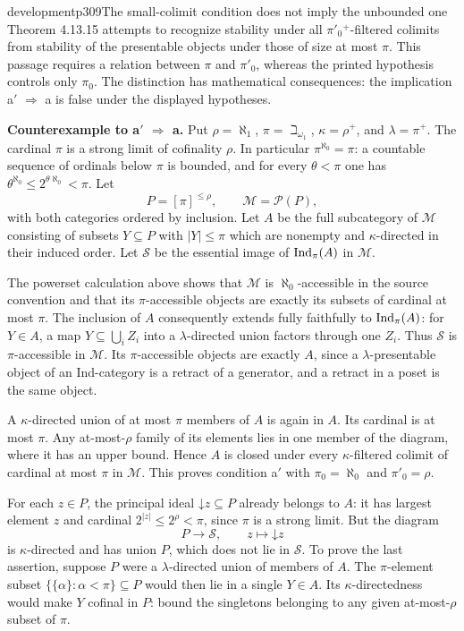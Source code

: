 \begin{dcomment}{development}{p309}{The small-colimit condition does not imply the unbounded one}
Theorem 4.13.15 attempts to recognize stability under all $\pi'_0{}^+$-filtered colimits from stability of the presentable objects under those of size at most $\pi$. This passage requires a relation between $\pi$ and $\pi'_0$, whereas the printed hypothesis controls only $\pi_0$. The distinction has mathematical consequences: the implication a$'$ $\Rightarrow$ a is false under the displayed hypotheses.

\textbf{Counterexample to a$'$ $\Rightarrow$ a.}\ours
Put $\rho=\aleph_1$, $\pi=\beth_{\omega_1}$, $\kappa=\rho^+$, and $\lambda=\pi^+$. The cardinal $\pi$ is a strong limit of cofinality $\rho$. In particular $\pi^{\aleph_0}=\pi$: a countable sequence of ordinals below $\pi$ is bounded, and for every $\theta<\pi$ one has $\theta^{\aleph_0}\leq 2^{\theta\aleph_0}<\pi$. Let
\[
 P=[\pi]^{\leq\rho},\qquad \mathcal M=\mathcal P(P),
\]
with both categories ordered by inclusion. Let $A$ be the full subcategory of $\mathcal M$ consisting of subsets $Y\subseteq P$ with $|Y|\leq\pi$ which are nonempty and $\kappa$-directed in their induced order. Let $\mathcal S$ be the essential image of $\mathrm{Ind}_\pi(A)$ in $\mathcal M$.

The powerset calculation above shows that $\mathcal M$ is $\aleph_0$-accessible in the source convention and that its $\pi$-accessible objects are exactly its subsets of cardinal at most $\pi$. The inclusion of $A$ consequently extends fully faithfully to $\mathrm{Ind}_\pi(A)$: for $Y\in A$, a map $Y\subseteq\bigcup_iZ_i$ into a $\lambda$-directed union factors through one $Z_i$. Thus $\mathcal S$ is $\pi$-accessible in $\mathcal M$. Its $\pi$-accessible objects are exactly $A$, since a $\lambda$-presentable object of an Ind-category is a retract of a generator, and a retract in a poset is the same object.

A $\kappa$-directed union of at most $\pi$ members of $A$ is again in $A$. Its cardinal is at most $\pi$. Any at-most-$\rho$ family of its elements lies in one member of the diagram, where it has an upper bound. Hence $A$ is closed under every $\kappa$-filtered colimit of cardinal at most $\pi$ in $\mathcal M$. This proves condition a$'$ with $\pi_0=\aleph_0$ and $\pi'_0=\rho$.

For each $z\in P$, the principal ideal $\mathord\downarrow z\subseteq P$ already belongs to $A$: it has largest element $z$ and cardinal $2^{|z|}\leq 2^\rho<\pi$, since $\pi$ is a strong limit. But the diagram
\[
 P\longrightarrow\mathcal S,\qquad z\longmapsto\mathord\downarrow z
\]
is $\kappa$-directed and has union $P$, which does not lie in $\mathcal S$. To prove the last assertion, suppose $P$ were a $\lambda$-directed union of members of $A$. The $\pi$-element subset $\{\{\alpha\}:\alpha<\pi\}\subseteq P$ would then lie in a single $Y\in A$. Its $\kappa$-directedness would make $Y$ cofinal in $P$: bound the singletons belonging to any given at-most-$\rho$ subset of $\pi$.


\end{dcomment}
